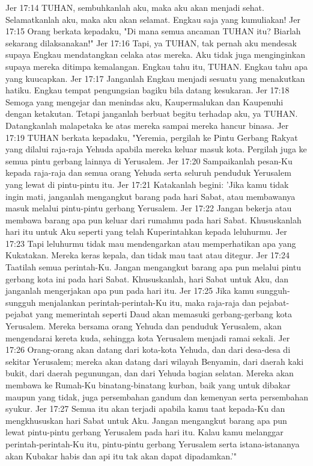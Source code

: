 Jer 17:14  TUHAN, sembuhkanlah aku, maka aku akan menjadi sehat. Selamatkanlah aku, maka aku akan selamat. Engkau saja yang kumuliakan!
Jer 17:15  Orang berkata kepadaku, "Di mana semua ancaman TUHAN itu? Biarlah sekarang dilaksanakan!"
Jer 17:16  Tapi, ya TUHAN, tak pernah aku mendesak supaya Engkau mendatangkan celaka atas mereka. Aku tidak juga menginginkan supaya mereka ditimpa kemalangan. Engkau tahu itu, TUHAN. Engkau tahu apa yang kuucapkan.
Jer 17:17  Janganlah Engkau menjadi sesuatu yang menakutkan hatiku. Engkau tempat pengungsian bagiku bila datang kesukaran.
Jer 17:18  Semoga yang mengejar dan menindas aku, Kaupermalukan dan Kaupenuhi dengan ketakutan. Tetapi janganlah berbuat begitu terhadap aku, ya TUHAN. Datangkanlah malapetaka ke atas mereka sampai mereka hancur binasa.
Jer 17:19  TUHAN berkata kepadaku, "Yeremia, pergilah ke Pintu Gerbang Rakyat yang dilalui raja-raja Yehuda apabila mereka keluar masuk kota. Pergilah juga ke semua pintu gerbang lainnya di Yerusalem.
Jer 17:20  Sampaikanlah pesan-Ku kepada raja-raja dan semua orang Yehuda serta seluruh penduduk Yerusalem yang lewat di pintu-pintu itu.
Jer 17:21  Katakanlah begini: 'Jika kamu tidak ingin mati, janganlah mengangkut barang pada hari Sabat, atau membawanya masuk melalui pintu-pintu gerbang Yerusalem.
Jer 17:22  Jangan bekerja atau membawa barang apa pun keluar dari rumahmu pada hari Sabat. Khususkanlah hari itu untuk Aku seperti yang telah Kuperintahkan kepada leluhurmu.
Jer 17:23  Tapi leluhurmu tidak mau mendengarkan atau memperhatikan apa yang Kukatakan. Mereka keras kepala, dan tidak mau taat atau ditegur.
Jer 17:24  Taatilah semua perintah-Ku. Jangan mengangkut barang apa pun melalui pintu gerbang kota ini pada hari Sabat. Khususkanlah, hari Sabat untuk Aku, dan janganlah mengerjakan apa pun pada hari itu.
Jer 17:25  Jika kamu sungguh-sungguh menjalankan perintah-perintah-Ku itu, maka raja-raja dan pejabat-pejabat yang memerintah seperti Daud akan memasuki gerbang-gerbang kota Yerusalem. Mereka bersama orang Yehuda dan penduduk Yerusalem, akan mengendarai kereta kuda, sehingga kota Yerusalem menjadi ramai sekali.
Jer 17:26  Orang-orang akan datang dari kota-kota Yehuda, dan dari desa-desa di sekitar Yerusalem; mereka akan datang dari wilayah Benyamin, dari daerah kaki bukit, dari daerah pegunungan, dan dari Yehuda bagian selatan. Mereka akan membawa ke Rumah-Ku binatang-binatang kurban, baik yang untuk dibakar maupun yang tidak, juga persembahan gandum dan kemenyan serta persembahan syukur.
Jer 17:27  Semua itu akan terjadi apabila kamu taat kepada-Ku dan mengkhususkan hari Sabat untuk Aku. Jangan mengangkut barang apa pun lewat pintu-pintu gerbang Yerusalem pada hari itu. Kalau kamu melanggar perintah-perintah-Ku itu, pintu-pintu gerbang Yerusalem serta istana-istananya akan Kubakar habis dan api itu tak akan dapat dipadamkan.'"

